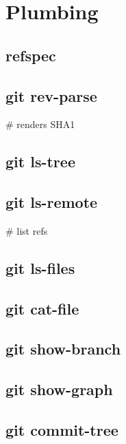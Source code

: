\section{Plumbing}

\subsection*{refspec}



\subsection*{git rev-parse}
 \# renders SHA1\\


\subsection*{git ls-tree}


\subsection*{git ls-remote}
 \# list refs

\subsection*{git ls-files}


\subsection*{git cat-file}


\subsection*{git show-branch}


\subsection*{git show-graph}


\subsection*{git commit-tree}


\ \\
